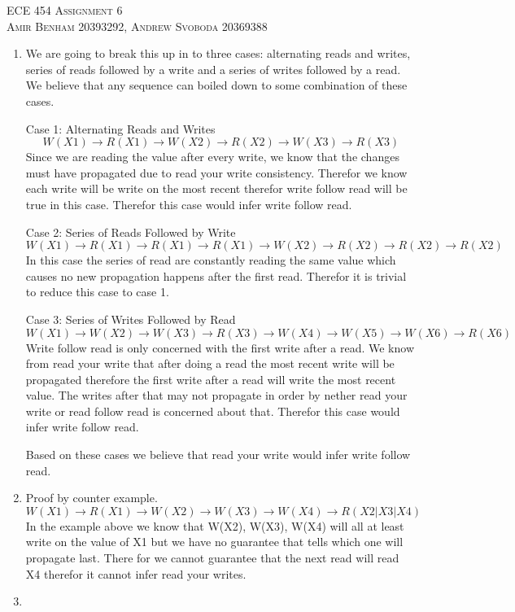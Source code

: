 \documentclass{article}
\begin{document}
\begin{center}
\textsc{\Large ECE 454 Assignment 6}\\[0.5cm]
\textsc{Amir Benham 20393292, Andrew Svoboda 20369388}\\[0.5cm]
\end{center}

\begin{enumerate}

	\item  

We are going to break this up in to three cases: alternating reads and writes, series of reads followed by a write and a series of writes followed by a read. We believe that any sequence can boiled down to some combination of these cases.

Case 1: Alternating Reads and Writes
\[ W(X1) \rightarrow R (X1) \rightarrow W(X2) \rightarrow R(X2) \rightarrow W(X3) \rightarrow R(X3) \]
Since we are reading the value after every write, we know that the changes must have propagated due to read your write consistency. Therefor we know each write will be write on the most recent therefor write follow read will be true in this case. Therefor this case would infer write follow read.

Case 2: Series of Reads Followed by Write
\[ W(X1) \rightarrow R (X1) \rightarrow R (X1)\rightarrow R (X1) \rightarrow W(X2) \rightarrow R (X2)\rightarrow R (X2)\rightarrow R (X2)\]
In this case the series of read are constantly reading the same value which causes no new propagation happens after the first read. Therefor it is trivial to reduce this case to case 1.

Case 3: Series of Writes Followed by Read
\[ W(X1) \rightarrow W (X2) \rightarrow W(X3)\rightarrow R (X3) \rightarrow W(X4) \rightarrow W (X5)\rightarrow W(X6)\rightarrow R (X6)\]
Write follow read is only concerned with the first write after a read. We know from read your write that after doing a read the most recent write will be propagated therefore the first write after a read will write the most recent value. The writes after that may not propagate in order by nether read your write or read follow read is concerned about that. Therefor this case would infer write follow read.

Based on these cases we believe that read your write would infer write follow read.

	\item  

Proof by counter example.
\[W(X1) \rightarrow R(X1) \rightarrow W(X2) \rightarrow W(X3) \rightarrow W(X4) \rightarrow R(X2|X3|X4) \]
In the example above we know that W(X2), W(X3), W(X4) will all at least write on the value of X1 but we have no guarantee that tells which one will propagate last. There for we cannot guarantee that the next read will read X4 therefor it cannot infer read your writes.
	\item  


\end{enumerate}
\end{document}
